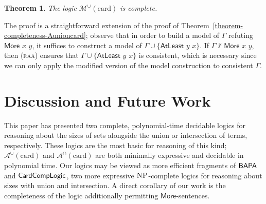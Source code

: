 \documentclass[letterpaper]{article} %
\newtheorem{theorem}{Theorem}[section]
\theoremstyle{definition}
\newcommand{\set}[1]{\{ #1 \}}
\newcommand{\Aunion}{\mathscr{A}^{\cup}}
\newcommand{\Munion}{\mathscr{M}^{\cup}}
\newcommand{\Ainter}{\mathscr{A}^{\cap}}
\newcommand{\BAPA}{\sf{BAPA}}
\newcommand{\CardCompLogic}{\sf{CardCompLogic}}
\newcommand{\proverule}{\textsc}
\newcommand{\raa}{\proverule{raa}}
\newcommand{\NP}{\textsc{NP}}
\newcommand{\Atleast}[2]{\mathsf{AtLeast}\,\,#1\,\,#2}
\newcommand{\More}[2]{\mathsf{More}\,\,#1\,\,#2}
\newcommand{\MoreNoArgs}{\mathsf{More}}
\newcommand{\card}{\mathrm{card}}
\begin{document}
\begin{theorem}
The logic $\Munion(\card)$ is complete.
\label{theorem-completeness-Munioncard}
\end{theorem}

The proof is a straightforward extension of the proof of Theorem~\ref{theorem-completeness-Aunioncard}; observe that in order to build a model of $\Gamma$ refuting $\More{x}{y}$, it suffices to construct a model of $\Gamma \cup \set{\Atleast{y}{x}}$. If $\Gamma\not\vdash \More{x}{y}$, then (\raa) ensures that $\Gamma \cup \set{\Atleast{y}{x}}$ is consistent, which is necessary since we can only apply the modified version of the model construction to consistent $\Gamma$.

\section{Discussion and Future Work}\label{s:future_work}

This paper has presented two complete, polynomial-time decidable logics for reasoning about the sizes of sets alongside the union or intersection of terms, respectively.  These logics are the most basic for reasoning of this kind; $\Aunion(\card)$ and $\Ainter(\card)$ are both minimally expressive and decidable in polynomial time.  Our logics may be viewed as more efficient fragments of $\BAPA$ and $\CardCompLogic$, two more expressive $\NP$-complete logics for reasoning about sizes with union and intersection.  A direct corollary of our work is the completeness of the logic additionally permitting $\MoreNoArgs$-sentences.
\end{document}
